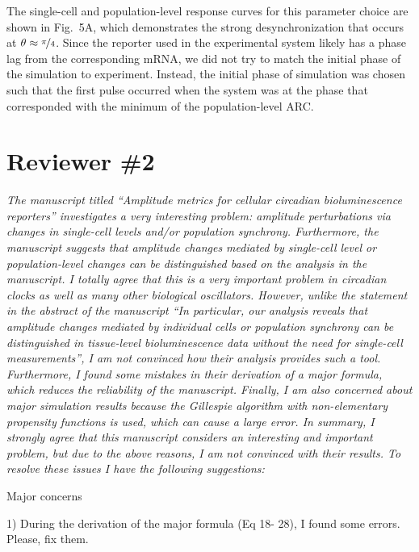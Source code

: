 \documentclass[11pt, letterpaper]{article}
\newenvironment{reviewer}{\itshape\color{gray}}{}
\newenvironment{manuscript}[1]{\begin{center}\begin{tcolorbox}[colback=green!5!white,colframe=green!75!black,width=0.8\textwidth,title={#1},breakable,fonttitle=\bfseries]}{\end{tcolorbox}\end{center}}
\begin{document}
\begin{manuscript}{Page 16}
The single-cell and population-level response curves for this parameter choice are shown in Fig.~5A, which demonstrates the strong desynchronization that occurs at $\theta\approx\nicefrac{\pi}{4}$.
Since the reporter used in the experimental system likely has a phase lag from the corresponding mRNA, we did not try to match the initial phase of the simulation to experiment.
Instead, the initial phase of simulation was chosen such that the first pulse occurred when the system was at the phase that corresponded with the minimum of the population-level ARC.
\end{manuscript}

\section*{Reviewer \#2}

\begin{reviewer}
The manuscript titled ``Amplitude metrics for cellular circadian bioluminescence reporters'' investigates a very interesting problem: amplitude perturbations via changes in single-cell levels and/or population synchrony.
Furthermore, the manuscript suggests that amplitude changes mediated by single-cell level or population-level changes can be distinguished based on the analysis in the manuscript.
I totally agree that this is a very important problem in circadian clocks as well as many other biological oscillators.
However, unlike the statement in the abstract of the manuscript ``In particular, our analysis reveals that amplitude changes mediated by individual cells or population synchrony can be distinguished in tissue-level bioluminescence data without the need for single-cell measurements'', I am not convinced how their analysis provides such a tool.
Furthermore, I found some mistakes in their derivation of a major formula, which reduces the reliability of the manuscript.
Finally, I am also concerned about major simulation results because the Gillespie algorithm with non-elementary propensity functions is used, which can cause a large error.
In summary, I strongly agree that this manuscript considers an interesting and important problem, but due to the above reasons, I am not convinced with their results.
To resolve these issues I have the following suggestions: 
 
Major concerns 
 
1) During the derivation of the major formula (Eq 18- 28), I found some errors. Please, fix them.
\end{reviewer}
\end{document}
